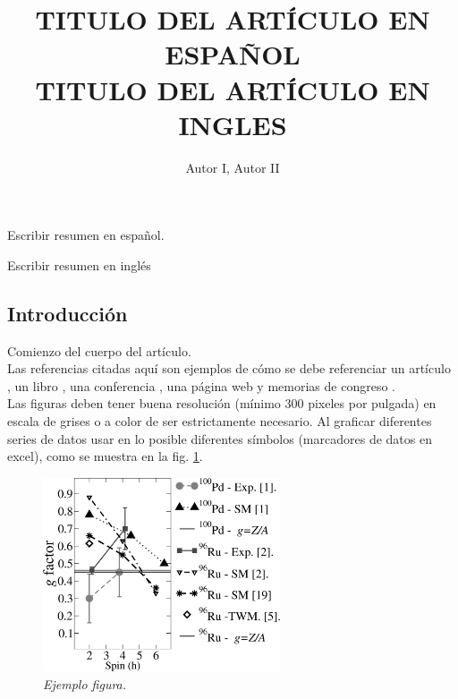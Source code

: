 \documentclass{momento}
\title{TITULO DEL ARTÍCULO EN ESPAÑOL\\[0.5cm]
TITULO DEL ARTÍCULO EN INGLES}
\author{Autor I\suprm1, Autor II \suprm2 }
\begin{document}
\maketitle

\begin{resumen}
    \noindent Escribir resumen en español.
\end{resumen}


\begin{ingles}
    \noindent Escribir resumen en inglés
\end{ingles}

\subsection*{Introducción}

\noindent Comienzo del cuerpo del artículo.\\

\noindent Las referencias citadas aquí son ejemplos de cómo se debe referenciar un artículo \cite{1}, un libro \cite{2}, una conferencia \cite{3}, una página web \cite{4} y memorias de congreso \cite{5}. \\

\noindent Las figuras deben tener buena resolución (mínimo 300 pixeles por pulgada) en escala de grises o a color de ser estrictamente necesario.  Al graficar diferentes series de datos usar en lo posible diferentes símbolos (marcadores de datos en excel), como se muestra en la fig. \ref{figura1}.

\begin{figure}
    \begin{center}
        \includegraphics[width=7cm]{figura1.jpg}
    \end{center}
    \caption{\itshape Ejemplo figura.}
    \label{figura1}
\end{figure}
\end{document}
